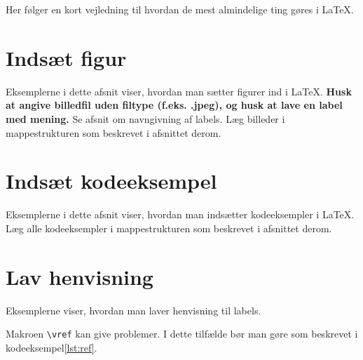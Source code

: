 \documentclass[simple,final]{../mypaper}
\begin{document}
Her følger en kort vejledning til hvordan de mest almindelige ting
gøres i \LaTeX .

\section{Indsæt figur}

Eksemplerne i dette afsnit viser, hvordan man sætter figurer ind i
\LaTeX . \textbf{Husk at angive billedfil uden filtype (f.eks. .jpeg),
  og husk at lave en label med mening.} Se afsnit om navngivning af
labels. Læg billeder i mappestrukturen som beskrevet i afsnittet
derom.






\section{Indsæt kodeeksempel}

Eksemplerne i dette afsnit viser, hvordan man indsætter kodeeksempler
i \LaTeX . Læg alle kodeeksempler i mappestrukturen som beskrevet i
afsnittet derom.




\section{Lav henvisning}

Eksemplerne viser, hvordan man laver henvisning til labels.



Makroen \texttt{\textbackslash vref} kan give problemer. I dette tilfælde
bør man gøre som beskrevet i kodeeksempel\vref{lst:ref}.


\end{document}
